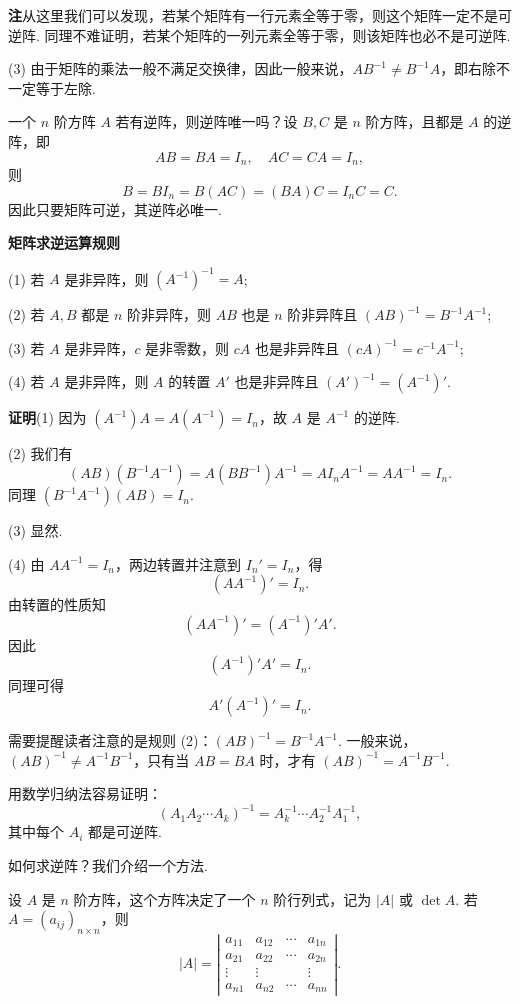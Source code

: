 \documentclass[UTF8,12pt,a4paper,fontset=fandol]{ctexart}
\begin{document}
\noindent\textbf{注}\quad 从这里我们可以发现，若某个矩阵有一行元素全等于零，则这个矩阵一定不是可逆阵. 同理不难证明，若某个矩阵的一列元素全等于零，则该矩阵也必不是可逆阵.

(3) 由于矩阵的乘法一般不满足交换律，因此一般来说，$AB^{-1}\ne B^{-1}A$，即右除不一定等于左除.

一个 $n$ 阶方阵 $A$ 若有逆阵，则逆阵唯一吗？设 $B,C$ 是 $n$ 阶方阵，且都是 $A$ 的逆阵，即
\[
AB=BA=I_n,\quad AC=CA=I_n,
\]
则
\[
B=BI_n=B(AC)=(BA)C=I_nC=C.
\]
因此只要矩阵可逆，其逆阵必唯一.

\noindent\textbf{矩阵求逆运算规则}

(1) 若 $A$ 是非异阵，则 $(A^{-1})^{-1}=A$;

(2) 若 $A,B$ 都是 $n$ 阶非异阵，则 $AB$ 也是 $n$ 阶非异阵且 $(AB)^{-1}=B^{-1}A^{-1}$;

(3) 若 $A$ 是非异阵，$c$ 是非零数，则 $cA$ 也是非异阵且 $(cA)^{-1}=c^{-1}A^{-1}$;

(4) 若 $A$ 是非异阵，则 $A$ 的转置 $A'$ 也是非异阵且 $(A')^{-1}=(A^{-1})'$.

\noindent\textbf{证明}\quad (1) 因为 $(A^{-1})A=A(A^{-1})=I_n$，故 $A$ 是 $A^{-1}$ 的逆阵.

(2) 我们有
\[
(AB)(B^{-1}A^{-1})=A(BB^{-1})A^{-1}=AI_nA^{-1}=AA^{-1}=I_n.
\]
同理 $(B^{-1}A^{-1})(AB)=I_n$.

(3) 显然.

(4) 由 $AA^{-1}=I_n$，两边转置并注意到 $I_n'=I_n$，得
\[
(AA^{-1})'=I_n.
\]
由转置的性质知
\[
(AA^{-1})'=(A^{-1})'A'.
\]
因此
\[
(A^{-1})'A'=I_n.
\]
同理可得
\[
A'(A^{-1})'=I_n.
\]

需要提醒读者注意的是规则 (2)：$(AB)^{-1}=B^{-1}A^{-1}$. 一般来说，$(AB)^{-1}\ne A^{-1}B^{-1}$，只有当 $AB=BA$ 时，才有 $(AB)^{-1}=A^{-1}B^{-1}$.

用数学归纳法容易证明：
\[
(A_1A_2\cdots A_k)^{-1}=A_k^{-1}\cdots A_2^{-1}A_1^{-1},
\]
其中每个 $A_i$ 都是可逆阵.

如何求逆阵？我们介绍一个方法.

设 $A$ 是 $n$ 阶方阵，这个方阵决定了一个 $n$ 阶行列式，记为 $|A|$ 或 $\det A$. 若 $A=(a_{ij})_{n\times n}$，则
\[
|A|=\left|\begin{array}{cccc}
a_{11} & a_{12} & \cdots & a_{1n}\\
a_{21} & a_{22} & \cdots & a_{2n}\\
\vdots & \vdots & & \vdots\\
a_{n1} & a_{n2} & \cdots & a_{nn}
\end{array}\right|.
\]
\end{document}

